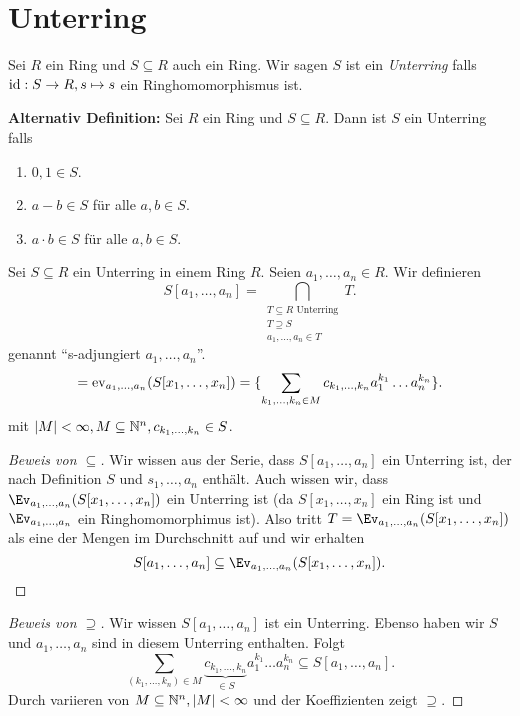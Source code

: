 \section{Unterring}
\begin{definition}
	Sei $R$ ein Ring und $S \subseteq R$ auch ein Ring. Wir sagen $S$ ist ein \emph{Unterring} falls $\operatorname{id}: S \to R, s \mapsto s$ 
	ein Ringhomomorphismus ist.
	
	\textbf{Alternativ Definition:}
	Sei $R$ ein Ring und $S \subseteq R$. Dann ist $S$ ein Unterring falls
	\begin{enumerate}
		\item $0,1 \in S$.
		\item $a-b \in S$ für alle $a,b \in S$.
		\item $a\cdot b \in S$ für alle $a,b \in S$.
	\end{enumerate}
\end{definition}

\begin{notation}
	Sei $S \subseteq R$ ein Unterring in einem Ring $R$.
	Seien $a_1,\ldots,a_{n} \in R$. Wir definieren
	\[
		S[a_1,\ldots,a_{n}] = \bigcap_{\substack{T \subseteq R \text{ Unterring}\\ T \supseteq S\\ a_1,\ldots,a_{n} \in T}} T 
	.\] 
	genannt \enquote{s-adjungiert $a_1,\ldots,a_{n}$}.
	\[
	= \operatorname{ev}_{a_1,\ldots,a_{n}}(S[x_1,\ldots,x_{n}]) = \{\sum_{k_1,\ldots,k_{n} \in M} c_{k_1,\ldots,k_{n}} a_1^{k_1} \ldots a_{n}^{k_{n}} \} 
	.\] 
	mit $\abs{M} < \infty, M \subseteq \mathbb{N}^{n}, c_{k_1,\ldots,k_{n}} \in S$.
\end{notation}

\begin{proof}[Beweis von $\subseteq$]
	Wir wissen aus der Serie, dass $S[a_1,\ldots,a_{n}]$ ein Unterring ist, der nach Definition $S$ und $s_1,\ldots,a_{n}$ enthält.
	Auch wissen wir, dass $\Ev_{a_1,\ldots,a_{n}}(S[x_1,\ldots,x_{n}])$ ein Unterring ist (da $S[x_1,\ldots,x_{n}]$ ein Ring ist und $\Ev_{a_1,\ldots,a_{n}}$ ein Ringhomomorphimus ist).
	Also tritt $T = \Ev_{a_1,\ldots,a_{n}}(S[x_1,\ldots,x_{n}])$ als eine der Mengen im Durchschnitt auf und wir erhalten
	\[
		S[a_1,\ldots,a_{n}] \subseteq \Ev_{a_1,\ldots,a_{n}}(S[x_1,\ldots,x_{n}])
	.\] 
\end{proof}

\begin{proof}[Beweis von $\supseteq$]
	Wir wissen $S[a_1,\ldots,a_{n}]$ ist ein Unterring.
	Ebenso haben wir $S$ und $a_1,\ldots,a_{n}$ sind in diesem Unterring enthalten. Folgt
	\[
		\sum_{(k_1,\ldots,k_{n}) \in M} \underbrace{c_{k_1,\ldots,k_{n}}}_{\in S} a_1^{k_1} \ldots a_{n}^{k_{n}} \subseteq S[a_1,\ldots,a_{n}]
	.\] 
	Durch variieren von $M \subseteq \mathbb{N}^{n}, \abs{M} < \infty$ und der Koeffizienten zeigt $\supseteq$.
\end{proof}

